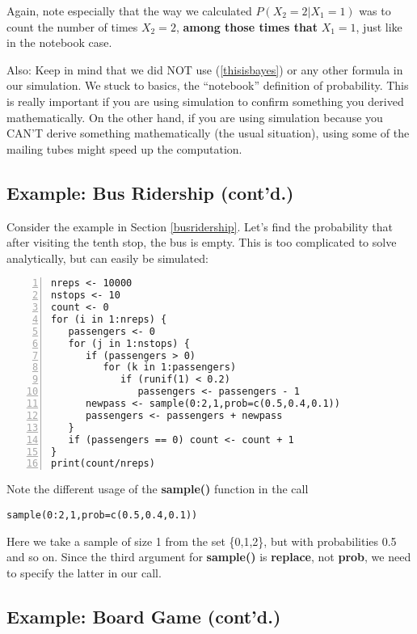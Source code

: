 Again, note especially that the way we calculated $P(X_2 = 2 | X_1 = 1)$
was to count the number of times $X_2 = 2$, {\bf among those times that}
$X_1 = 1$, just like in the notebook case.

Also:  Keep in mind that we did NOT use (\ref{thisisbayes}) or any other
formula in our simulation.  We stuck to basics, the ``notebook''
definition of probability.  This is really important if you are using
simulation to confirm something you derived mathematically.  On the
other hand, if you are using simulation because you CAN'T derive
something mathematically (the usual situation), using some of the
mailing tubes might speed up the computation.

\subsection{Example:  Bus Ridership (cont'd.)}
\label{busridershipsim}

Consider the example in Section \ref{busridership}.  Let's find the
probability that after visiting the tenth stop, the bus is empty.  This
is too complicated to solve analytically, but can easily be simulated:

\begin{Verbatim}[fontsize=\relsize{-2},numbers=left]
nreps <- 10000
nstops <- 10
count <- 0
for (i in 1:nreps) {
   passengers <- 0
   for (j in 1:nstops) {
      if (passengers > 0) 
         for (k in 1:passengers) 
            if (runif(1) < 0.2) 
               passengers <- passengers - 1
      newpass <- sample(0:2,1,prob=c(0.5,0.4,0.1))
      passengers <- passengers + newpass
   }
   if (passengers == 0) count <- count + 1
}
print(count/nreps)
\end{Verbatim}

Note the different usage of the {\bf sample()} function in the call

\begin{Verbatim}[fontsize=\relsize{-2}]
sample(0:2,1,prob=c(0.5,0.4,0.1))
\end{Verbatim}

Here we take a sample of size 1 from the set \{0,1,2\}, but with
probabilities 0.5 and so on.  Since the third argument for {\bf
sample()} is {\bf replace}, not {\bf prob}, we need to specify the
latter in our call.

\subsection{Example: Board Game (cont'd.)}

